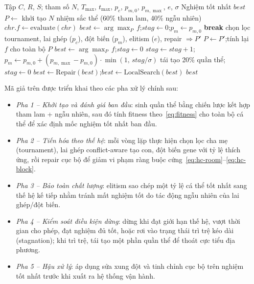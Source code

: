 \documentclass[a4paper,12pt,oneside]{article}
\begin{document}
	\begin{algorithm}[H]
		\caption{Genetic Algorithm cho bài toán xếp thời khóa biểu đại học}
		\label{alg:ga}
		\begin{algorithmic}[1]
			\Require Tập $C$, $R$, $S$; tham số $N$, $T_{\max}$, $t_{\max}$, $p_c$, $p_{m,0}$, $p_{m,\max}$, $e$, $\sigma$
			\Ensure Nghiệm tốt nhất $\mathit{best}$
			\State $P \leftarrow$ khởi tạo $N$ nhiệm sắc thể (60\% tham lam, 40\% ngẫu nhiên)
			\State $\mathit{chr}.f \leftarrow \mathrm{evaluate}(\mathit{chr})$ 
			\EndFor
			\State $\mathit{best} \leftarrow \arg\max_{P}\,f$;\quad $\mathit{stag} \leftarrow 0$;\quad $p_m \leftarrow p_{m,0}$
			\State \textbf{break}
			\EndIf
			\State chọn lọc tournament, lai ghép ($p_c$), đột biến ($p_m$), elitism ($e$), repair $\Rightarrow P'$
			\State $P \leftarrow P'$;\quad tính lại $f$ cho toàn bộ $P$
			\State $\mathit{best} \leftarrow \arg\max_{P}\,f$;\quad $\mathit{stag} \leftarrow 0$
			\Else
			\State $\mathit{stag} \leftarrow \mathit{stag}+1$;\quad $p_m \leftarrow p_{m,0}+(p_{m,\max}-p_{m,0})\cdot\min(1,\,\mathit{stag}/\sigma)$
			\EndIf
			 tái tạo 20\% quần thể;\quad $\mathit{stag} \leftarrow 0$ \EndIf
			\EndFor
			\State $\mathit{best} \leftarrow \mathrm{Repair}(\mathit{best})$;\quad $\mathit{best} \leftarrow \mathrm{LocalSearch}(\mathit{best})$
			\State \Return $\mathit{best}$
		\end{algorithmic}
	\end{algorithm}
	
	Mã giả trên được triển khai theo các pha xử lý chính sau:
	\begin{itemize}
		\item \textit{Pha 1 -- Khởi tạo và đánh giá ban đầu}: sinh quần thể bằng chiến lược kết hợp tham lam + ngẫu nhiên, sau đó tính fitness theo~\eqref{eq:fitness} cho toàn bộ cá thể để xác định mốc nghiệm tốt nhất ban đầu.
		\item \textit{Pha 2 -- Tiến hóa theo thế hệ}: mỗi vòng lặp thực hiện chọn lọc cha mẹ (tournament), lai ghép conflict-aware tạo con, đột biến gene với tỷ lệ thích ứng, rồi repair cục bộ để giảm vi phạm ràng buộc cứng~\eqref{eq:hc-room}--\eqref{eq:hc-block}.
		\item \textit{Pha 3 -- Bảo toàn chất lượng}: elitism sao chép một tỷ lệ cá thể tốt nhất sang thế hệ kế tiếp nhằm tránh mất nghiệm tốt do tác động ngẫu nhiên của lai ghép/đột biến.
		\item \textit{Pha 4 -- Kiểm soát điều kiện dừng}: dừng khi đạt giới hạn thế hệ, vượt thời gian cho phép, đạt nghiệm đủ tốt, hoặc rơi vào trạng thái trì trệ kéo dài (stagnation); khi trì trệ, tái tạo một phần quần thể để thoát cực tiểu địa phương.
		\item \textit{Pha 5 -- Hậu xử lý}: áp dụng sửa xung đột và tinh chỉnh cục bộ trên nghiệm tốt nhất trước khi xuất ra hệ thống vận hành.
	\end{itemize}
	
\end{document}
